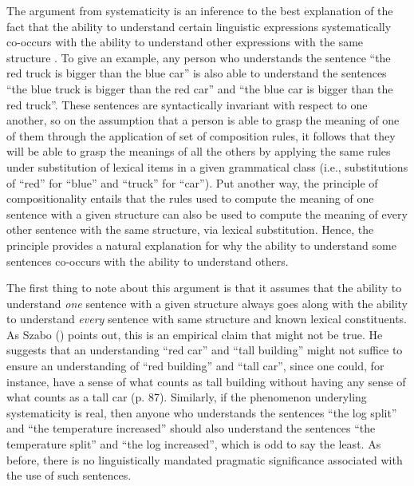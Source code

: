 The argument from systematicity is an inference to the best explanation of the fact that the ability to understand certain linguistic expressions systematically co-occurs with the ability to understand other expressions with the same structure \citep{FodorPylyshyn:1988,Szabo:2012,Szabo:2013,FodorLepore:2002}. To give an example, any person who understands the sentence ``the red truck is bigger than the blue car'' is also able to understand the sentences ``the blue truck is bigger than the red car'' and ``the blue car is bigger than the red truck''. These sentences are syntactically invariant with respect to one another, so on the assumption that a person is able to grasp the meaning of one of them through the application of set of composition rules, it follows that they will be able to grasp the meanings of all the others by applying the same rules under substitution of lexical items in a given grammatical class (i.e., substitutions of ``red'' for ``blue'' and ``truck'' for ``car''). Put another way, the principle of compositionality entails that the rules used to compute the meaning of one sentence with a given structure can also be used to compute the meaning of every other sentence with the same structure, via lexical substitution. Hence, the principle provides a natural explanation for why the ability to understand some sentences co-occurs with the ability to understand others. 

The first thing to note about this argument is that it assumes that the ability to understand \textit{one} sentence with a given structure always goes along with the ability to understand \textit{every} sentence with same structure and known lexical constituents. As Szabo (\citeyear{Szabo:2013,Szabo:2012}) points out, this is an empirical claim that might not be true. He suggests that an understanding ``red car'' and ``tall building'' might not suffice to ensure an understanding of ``red building'' and ``tall car'', since one could, for instance, have a sense of what counts as tall building without having any sense of what counts as a tall car (p. 87). Similarly, if the phenomenon underyling systematicity is real, then anyone who understands the sentences ``the log split'' and ``the temperature increased'' should also understand the sentences ``the temperature split'' and ``the log increased'', which is odd to say the least. As before, there is no linguistically mandated pragmatic significance associated with the use of such sentences.

